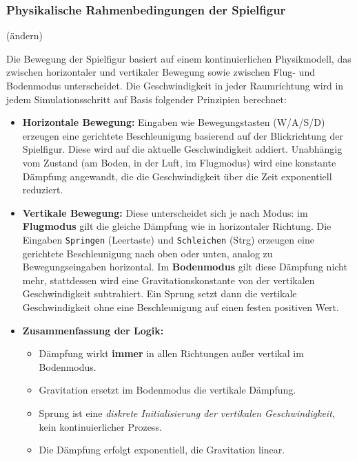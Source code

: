\documentclass{article}
\begin{document}
\subsubsection*{Physikalische Rahmenbedingungen der Spielfigur} (ändern)

Die Bewegung der Spielfigur basiert auf einem kontinuierlichen Physikmodell, das zwischen horizontaler und vertikaler Bewegung sowie zwischen Flug- und Bodenmodus unterscheidet. Die Geschwindigkeit in jeder Raumrichtung wird in jedem Simulationsschritt auf Basis folgender Prinzipien berechnet:

\begin{itemize}
  \item \textbf{Horizontale Bewegung:}  Eingaben wie Bewegungstasten (W/A/S/D) erzeugen eine gerichtete Beschleunigung basierend auf der Blickrichtung der Spielfigur. Diese wird auf die aktuelle Geschwindigkeit addiert. Unabhängig vom Zustand (am Boden, in der Luft, im Flugmodus) wird eine konstante Dämpfung angewandt, die die Geschwindigkeit über die Zeit exponentiell reduziert.

  \item \textbf{Vertikale Bewegung:}  Diese unterscheidet sich je nach Modus: im \textbf{Flugmodus} gilt die gleiche Dämpfung wie in horizontaler Richtung. Die Eingaben \texttt{Springen} (Leertaste) und \texttt{Schleichen} (Strg) erzeugen eine gerichtete Beschleunigung nach oben oder unten, analog zu Bewegungseingaben horizontal. Im \textbf{Bodenmodus} gilt diese Dämpfung nicht mehr, stattdessen wird eine Gravitationskonstante von der vertikalen Geschwindigkeit subtrahiert. Ein Sprung setzt dann die vertikale Geschwindigkeit ohne eine Beschleunigung auf einen festen positiven Wert.

  \item \textbf{Zusammenfassung der Logik:}
  \begin{itemize}
    \item Dämpfung wirkt \textbf{immer} in allen Richtungen au\ss{}er vertikal im Bodenmodus.
    \item Gravitation ersetzt im Bodenmodus die vertikale Dämpfung.
    \item Sprung ist eine \textit{diskrete Initialisierung der vertikalen Geschwindigkeit}, kein kontinuierlicher Prozess.
    \item Die Dämpfung erfolgt exponentiell, die Gravitation linear.
  \end{itemize}
\end{itemize}
\end{document}
